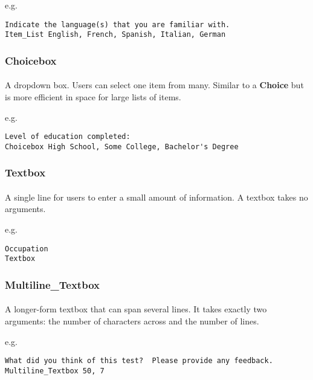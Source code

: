 e.g.

\begin{lstlisting}
Indicate the language(s) that you are familiar with.
Item_List English, French, Spanish, Italian, German
\end{lstlisting}

\subsubsection{Choicebox}

\paragraph{}
A dropdown box.  Users can select one item from many.  Similar to a \textbf{Choice} but is more efficient in space for large lists of items.

e.g.

\begin{lstlisting}
Level of education completed:
Choicebox High School, Some College, Bachelor's Degree
\end{lstlisting}

\subsubsection{Textbox}

\paragraph{}
A single line for users to enter a small amount of information.  A textbox takes no arguments.

e.g.

\begin{lstlisting}
Occupation
Textbox
\end{lstlisting}

\subsubsection{Multiline\_Textbox}

\paragraph{}
A longer-form textbox that can span several lines.  It takes exactly two arguments: the number of characters across and the number of lines.

e.g.

\begin{lstlisting}
What did you think of this test?  Please provide any feedback.
Multiline_Textbox 50, 7
\end{lstlisting}

